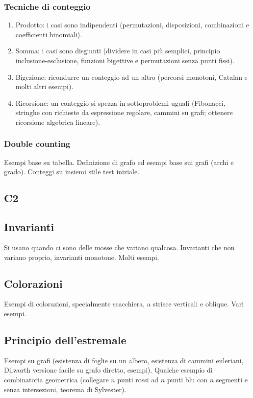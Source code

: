 \documentclass[a4paper,10pt]{article}
\begin{document}
\subsubsection{Tecniche di conteggio}
\begin{enumerate}
	\item Prodotto: i casi sono indipendenti (permutazioni, disposizioni, combinazioni e coefficienti binomiali).
	\item Somma: i casi sono disgiunti (dividere in casi più semplici, principio inclusione-esclusione, funzioni bigettive e permutazioni senza punti fissi).
	\item Bigezione: ricondurre un conteggio ad un altro (percorsi monotoni, Catalan e molti altri esempi).
	\item Ricorsione: un conteggio si spezza in sottoproblemi uguali (Fibonacci, stringhe con richieste da espressione regolare, cammini su grafi; ottenere ricorsione algebrica lineare).
\end{enumerate}

\subsubsection{Double counting}
Esempi base su tabella. Definizione di grafo ed esempi base sui grafi (archi e grado). Conteggi su insiemi stile test iniziale.

\subsection{C2}
\subsection{Invarianti}
Si usano quando ci sono delle mosse che variano qualcosa. Invarianti che non variano proprio, invarianti monotone. Molti esempi.

\subsection{Colorazioni}
Esempi di colorazioni, specialmente scacchiera, a strisce verticali e oblique. Vari esempi.

\subsection{Principio dell'estremale}
Esempi su grafi (esistenza di foglie su un albero, esistenza di cammini euleriani, Dilworth versione facile su grafo diretto, esempi). Qualche esempio di combinatoria geometrica (collegare $n$ punti rossi ad $n$ punti blu con $n$ segmenti e senza intersezioni, teorema di Sylvester).
\end{document}
